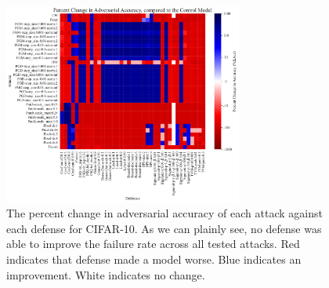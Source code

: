 \documentclass[journal]{IEEEtran}
\begin{document}
\begin{figure}[!ht]
    {\centering
    \includegraphics[trim={0 0.85em 0 0.4em},clip,width=0.7\textwidth]{Fig11.pdf}
    \caption{The percent change in adversarial accuracy of each attack against each defense for CIFAR-10. As we can plainly see, no defense was able to improve the failure rate across all tested attacks. Red indicates that defense made a model worse. Blue indicates an improvement. White indicates no change.}
    \label{fig:adv_acc_grid}
    } %
\end{figure}
\end{document}
